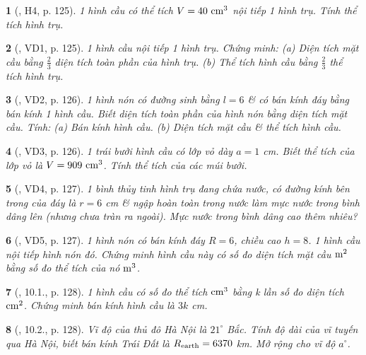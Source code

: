 \documentclass{article}
\newtheorem{baitoan}{}
\begin{document}
\begin{baitoan}[\cite{Binh_boi_duong_Toan_9_tap_2}, H4, p. 125]
	1 hình cầu có thể tích $V = 40\ {\rm cm}^3$ nội tiếp 1 hình trụ. Tính thể tích hình trụ.
\end{baitoan}

\begin{baitoan}[\cite{Binh_boi_duong_Toan_9_tap_2}, VD1, p. 125]
	1 hình cầu nội tiếp 1 hình trụ. Chứng minh: (a) Diện tích mặt cầu bằng $\frac{2}{3}$ diện tích toàn phần của hình trụ. (b) Thể tích hình cầu bằng $\frac{2}{3}$ thể tích hình trụ.
\end{baitoan}

\begin{baitoan}[\cite{Binh_boi_duong_Toan_9_tap_2}, VD2, p. 126]
	1 hình nón có đường sinh bằng $l = 6$ \& có bán kính đáy bằng bán kính 1 hình cầu. Biết diện tích toàn phần của hình nón bằng diện tích mặt cầu. Tính: (a) Bán kính hình cầu. (b) Diện tích mặt cầu \& thể tích hình cầu.
\end{baitoan}

\begin{baitoan}[\cite{Binh_boi_duong_Toan_9_tap_2}, VD3, p. 126]
	1 trái bưởi hình cầu có lớp vỏ dày $a = 1$ {\rm cm}. Biết thể tích của lớp vỏ là $V = 909\ {\rm cm}^3$. Tính thể tích của các múi bưởi.
\end{baitoan}

\begin{baitoan}[\cite{Binh_boi_duong_Toan_9_tap_2}, VD4, p. 127]
	1 bình thủy tinh hình trụ đang chứa nước, có đường kính bên trong của đáy là $r = 6$ {\rm cm} \& ngập hoàn toàn trong nước làm mực nước trong bình dâng lên (nhưng chưa tràn ra ngoài). Mực nước trong bình dâng cao thêm nhiêu?
\end{baitoan}

\begin{baitoan}[\cite{Binh_boi_duong_Toan_9_tap_2}, VD5, p. 127]
	1 hình nón có bán kính đáy $R = 6$, chiều cao $h = 8$. 1 hình cầu nội tiếp hình nón đó. Chứng minh hình cầu này có số đo diện tích mặt cầu $\rm m^2$ bằng số đo thể tích của nó $\rm m^3$.
\end{baitoan}

\begin{baitoan}[\cite{Binh_boi_duong_Toan_9_tap_2}, 10.1., p. 128]
	1 hình cầu có số đo thể tích $\rm cm^3$ bằng k lần số đo diện tích $\rm cm^2$. Chứng minh bán kính hình cầu là $3k$ {\rm cm}.
\end{baitoan}

\begin{baitoan}[\cite{Binh_boi_duong_Toan_9_tap_2}, 10.2., p. 128]
	Vĩ độ của thủ đô Hà Nội là $21^\circ$ Bắc. Tính độ dài của vĩ tuyến qua Hà Nội, biết bán kính Trái Đất là $R_{\rm earth} = 6370$ {\rm km}. Mở rộng cho vĩ độ $a^\circ$.
\end{baitoan}
\end{document}
